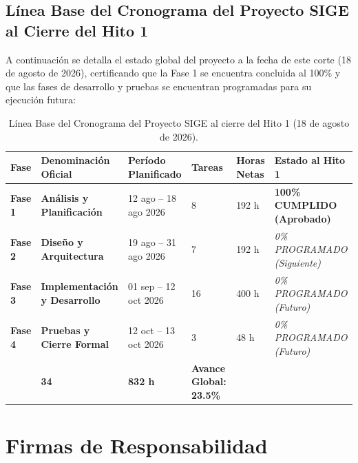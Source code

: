 \documentclass[12pt,a4paper]{article}
\begin{document}
\subsection{Línea Base del Cronograma del Proyecto SIGE al Cierre del Hito 1}
A continuación se detalla el estado global del proyecto a la fecha de este corte (18 de agosto de 2026), certificando que la Fase 1 se encuentra concluida al 100\% y que las fases de desarrollo y pruebas se encuentran programadas para su ejecución futura:

\begin{table}[H]
\centering
\small
\renewcommand{\arraystretch}{1.2}
\begin{tabularx}{\textwidth}{|>{\hsize=0.6\hsize\centering\arraybackslash\footnotesize}X|>{\hsize=1.3\hsize\raggedright\arraybackslash\bfseries\footnotesize}X|>{\hsize=1.1\hsize\centering\arraybackslash\footnotesize}X|>{\hsize=0.5\hsize\centering\arraybackslash\footnotesize}X|>{\hsize=0.6\hsize\centering\arraybackslash\footnotesize}X|>{\hsize=1.9\hsize\centering\arraybackslash\footnotesize}X|}
\hline
\rowcolor{tableheader}
\textbf{Fase} & \textbf{Denominación Oficial} & \textbf{Período Planificado} & \textbf{Tareas} & \textbf{Horas Netas} & \textbf{Estado al Hito 1} \\
\hline
\textbf{Fase 1} & Análisis y Planificación & 12 ago -- 18 ago 2026 & 8 & 192 h & \textbf{100\% CUMPLIDO (Aprobado)} \\
\hline
\textbf{Fase 2} & Diseño y Arquitectura & 19 ago -- 31 ago 2026 & 7 & 192 h & \textit{0\% PROGRAMADO (Siguiente)} \\
\hline
\textbf{Fase 3} & Implementación y Desarrollo & 01 sep -- 12 oct 2026 & 16 & 400 h & \textit{0\% PROGRAMADO (Futuro)} \\
\hline
\textbf{Fase 4} & Pruebas y Cierre Formal & 12 oct -- 13 oct 2026 & 3 & 48 h & \textit{0\% PROGRAMADO (Futuro)} \\
\hline
\multicolumn{3}{|r|}{\textbf{TOTAL GENERAL DEL PROYECTO:}} & \textbf{34} & \textbf{832 h} & \textbf{Avance Global: 23.5\%} \\
\hline
\end{tabularx}
\caption{Línea Base del Cronograma del Proyecto SIGE al cierre del Hito 1 (18 de agosto de 2026).}
\label{tab:linea_base_hito1}
\end{table}

\section{Firmas de Responsabilidad}
\end{document}
